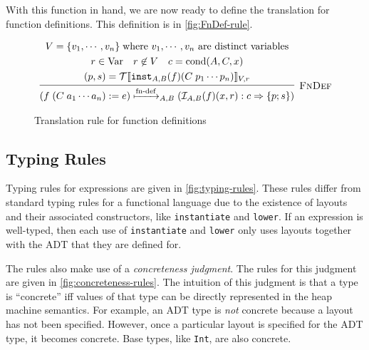 With this function in hand, we are now ready to define the translation for \tool function definitions. This
definition is in \autoref{fig:FnDef-rule}.

\begin{figure}
\[
\begin{array}{c}
  \labinfer[FnDef]{(f\; (C\; a_1 \cdots a_n) := e) \defstep{A,B} (\mathcal{I}_{A,B}(f)(x, r) : c \Ra \{p ; s\})}
    {\begin{gathered}
          \VarSet = \{ v_1 , \cdots , v_n \}\; \textnormal{where $v_1, \cdots, v_n$ are distinct variables}
      \\  r \in \Var
      ~~~ r \not\in \VarSet
      ~~~ c = \cond(A, C, x)
      \\  (p, s) = \Tsem{\instantiateS{A,B}{f}(C\; p_1 \cdots p_n)}{\VarSet, r}
     \end{gathered}
    }
\end{array}
\]
\caption{Translation rule for function definitions}
\label{fig:FnDef-rule}
\end{figure}


\subsection{Typing Rules}

Typing rules for \tool expressions are given in
\autoref{fig:typing-rules}. These rules differ from standard typing
rules for a functional language due to the existence of layouts and
their associated constructors, like \lstinline[language=Pika]{instantiate} and
\lstinline[language=Pika]{lower}. If an expression is well-typed, then each use of
\lstinline[language=Pika]{instantiate} and \lstinline[language=Pika]{lower} only uses layouts together with
the ADT that they are defined for.

The rules also make use of a \textit{concreteness judgment}. The rules
for this judgment are given in \autoref{fig:concreteness-rules}. The
intuition of this judgment is that a type is ``concrete'' iff values
of that type can be directly represented in the heap machine
semantics. For example, an ADT type is \textit{not} concrete because a
layout has not been specified. However, once a particular layout is
specified for the ADT type, it becomes concrete. Base types, like
\lstinline[language=Pika]{Int}, are also concrete.


